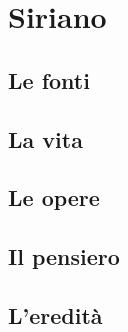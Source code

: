 \chapter{Siriano}

\section{Le fonti}

\section{La vita}

\section{Le opere}

\section{Il pensiero}

\section{L'eredità}
